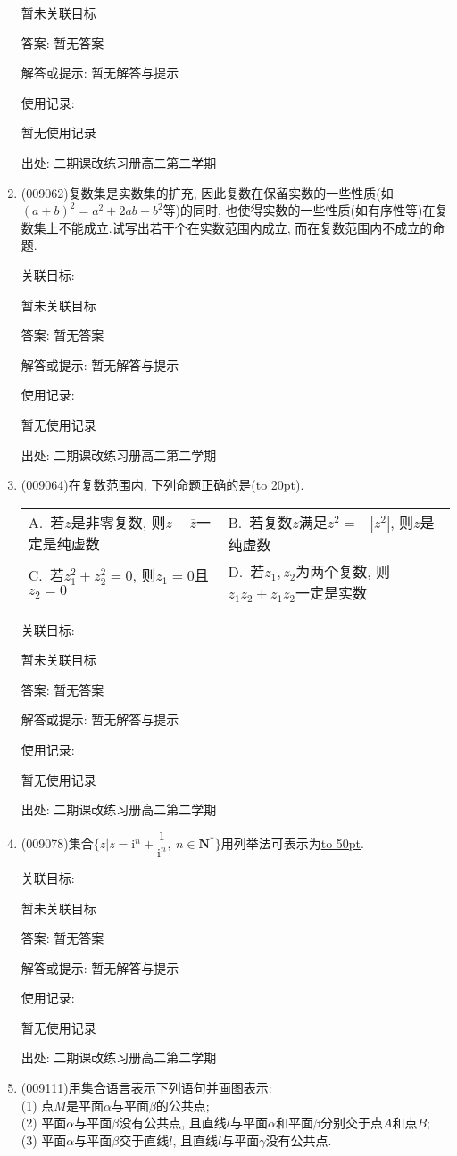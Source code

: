\documentclass[10pt,a4paper]{article}
\newcommand{\blank}[1]{\underline{\hbox to #1pt{}}}
\newcommand{\bracket}[1]{(\hbox to #1pt{})}
\newcommand{\twoch}[4]{\par\begin{tabular}{p{.46\textwidth}p{.46\textwidth}}
A.~#1& B.~#2\\
C.~#3& D.~#4
\end{tabular}}
\begin{document}
\begin{enumerate}[1.]
暂未关联目标

答案: 暂无答案

解答或提示: 暂无解答与提示

使用记录:

暂无使用记录


出处: 二期课改练习册高二第二学期
\item { (009062)}复数集是实数集的扩充, 因此复数在保留实数的一些性质(如$(a+b)^2=a^2+2ab+b^2$等)的同时, 也使得实数的一些性质(如有序性等)在复数集上不能成立.试写出若干个在实数范围内成立, 而在复数范围内不成立的命题.


关联目标:

暂未关联目标

答案: 暂无答案

解答或提示: 暂无解答与提示

使用记录:

暂无使用记录


出处: 二期课改练习册高二第二学期
\item { (009064)}在复数范围内, 下列命题正确的是\bracket{20}.
\twoch{若$z$是非零复数, 则$z-\overline z$一定是纯虚数}{若复数$z$满足$z^2=-|z^2|$, 则$z$是纯虚数}{若$z_1^2+z_2^2=0$, 则$z_1=0$且$z_2=0$}{若$z_1,z_2$为两个复数, 则$z_1\overline  z_2+\overline  z_1z_2$一定是实数}


关联目标:

暂未关联目标

答案: 暂无答案

解答或提示: 暂无解答与提示

使用记录:

暂无使用记录


出处: 二期课改练习册高二第二学期
\item { (009078)}集合$\{z|z=\mathrm{i}^n+\dfrac 1{\mathrm{i}^n}, \ n\in \mathbf{N}^*\}$用列举法可表示为\blank{50}.


关联目标:

暂未关联目标

答案: 暂无答案

解答或提示: 暂无解答与提示

使用记录:

暂无使用记录


出处: 二期课改练习册高二第二学期
\item { (009111)}用集合语言表示下列语句并画图表示:\\
(1) 点$M$是平面$\alpha$与平面$\beta$的公共点;\\
(2) 平面$\alpha$与平面$\beta$没有公共点, 且直线$l$与平面$\alpha$和平面$\beta$分别交于点$A$和点$B$;\\
(3) 平面$\alpha$与平面$\beta$交于直线$l$, 且直线$l$与平面$\gamma$没有公共点.



\end{enumerate}
\end{document}
